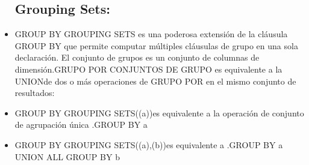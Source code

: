 \begin{itemize}
\subsection{Grouping Sets:}
	\item GROUP BY GROUPING SETS es una poderosa extensión de la cláusula GROUP BY que permite computar múltiples cláusulas de grupo en una sola declaración. El conjunto de grupos es un conjunto de columnas de dimensión.GRUPO POR CONJUNTOS DE GRUPO es equivalente a la UNIONde dos o más operaciones de GRUPO POR en el mismo conjunto de resultados:
	\item GROUP BY GROUPING SETS((a))es equivalente a la operación de conjunto de agrupación única .GROUP BY a
	\item GROUP BY GROUPING SETS((a),(b))es equivalente a .GROUP BY a UNION ALL GROUP BY b
\end{itemize}





